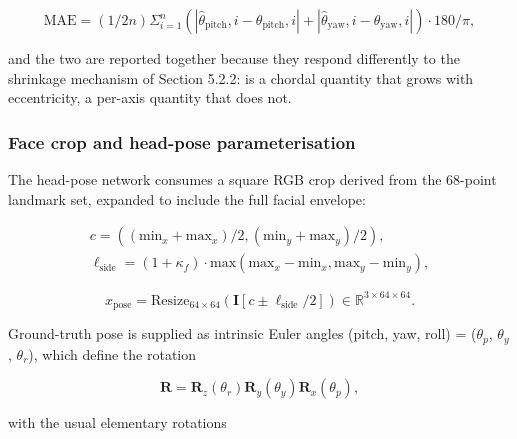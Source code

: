 \begin{equation}
\label{eq:21}
\mathrm{MAE} = (1/2n) \Sigma _{i=1}^{n} ( |\hat{\theta }_{\mathrm{pitch}},i - \theta _{\mathrm{pitch}},i| + |\hat{\theta }_{\mathrm{yaw}},i - \theta _{\mathrm{yaw}},i| ) \cdot 180/\pi ,
\end{equation}

and the two are reported together because they respond differently to the shrinkage mechanism of Section 5.2.2:  is a chordal quantity that grows with eccentricity,  a per-axis quantity that does not.

\subsubsection{Face crop and head-pose parameterisation}

The head-pose network consumes a square RGB crop derived from the 68-point landmark set, expanded to include the full facial envelope:

\begin{equation}
\label{eq:22}
\begin{aligned}
c = ( (\mathrm{min}_x + \mathrm{max}_x)/2 , (\mathrm{min}_y + \mathrm{max}_y)/2 ), \\
\ell _{\mathrm{side}} = (1 + \kappa _f) \cdot \mathrm{max}( \mathrm{max}_x - \mathrm{min}_x , \mathrm{max}_y - \mathrm{min}_y ),
\end{aligned}
\end{equation}

\begin{equation}
\label{eq:23}
x_{\mathrm{pose}} = \mathrm{Resize}_{64\times 64} ( \mathbf{I} [ c \pm \ell _{\mathrm{side}}/2 ] ) \in \mathbb{R}^{3\times 64\times 64}.
\end{equation}

Ground-truth pose is supplied as intrinsic Euler angles (pitch, yaw, roll) = ($\theta_{p}$, $\theta_{y}$, $\theta_{r}$), which define the rotation

\begin{equation}
\label{eq:24}
\mathbf{R} = \mathbf{R}_z(\theta _r) \mathbf{R}_y(\theta _y) \mathbf{R}_x(\theta _p),
\end{equation}

with the usual elementary rotations

